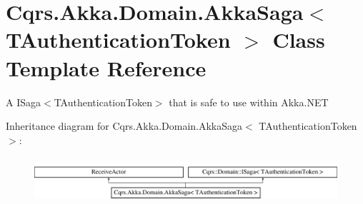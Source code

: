 \hypertarget{classCqrs_1_1Akka_1_1Domain_1_1AkkaSaga}{}\section{Cqrs.\+Akka.\+Domain.\+Akka\+Saga$<$ T\+Authentication\+Token $>$ Class Template Reference}
\label{classCqrs_1_1Akka_1_1Domain_1_1AkkaSaga}


A I\+Saga$<$\+T\+Authentication\+Token$>$ that is safe to use within Akka.\+N\+ET  


Inheritance diagram for Cqrs.\+Akka.\+Domain.\+Akka\+Saga$<$ T\+Authentication\+Token $>$\+:\begin{figure}[H]
\begin{center}
\leavevmode
\includegraphics[height=1.696970cm]{classCqrs_1_1Akka_1_1Domain_1_1AkkaSaga}
\end{center}
\end{figure}
